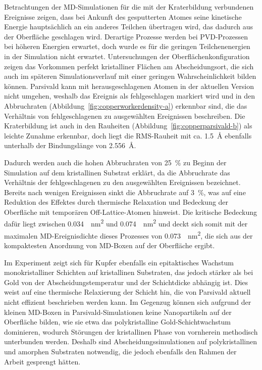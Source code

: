 Betrachtungen der MD-Simulationen für die mit der Kraterbildung verbundenen Ereignisse zeigen, dass bei Ankunft des gesputterten Atomes seine kinetische Energie hauptsächlich an ein anderes Teilchen übertragen wird, das dadurch aus der Oberfläche geschlagen wird.
Derartige Prozesse werden bei PVD-Prozessen bei höheren Energien erwartet\cite{mattox_handbook_2010}, doch wurde es für die geringen Teilchenenergien in der Simulation nicht erwartet.
Untersuchungen der Oberflächenkonfiguration zeigen das Vorkommen perfekt kristalliner Flächen am Abscheidungsort, die sich auch im späteren Simulationsverlauf mit einer geringen Wahrscheinlichkeit bilden können.
Parsivald kann mit herausgeschlagenen Atomen in der aktuellen Version nicht umgehen, weshalb das Ereignis als fehlgeschlagen markiert wird und in den Abbruchraten (Abbildung~\ref{fig:copperworkerdensity-a}) erkennbar sind, die das Verhältnis von fehlgeschlagenen zu ausgewählten Ereignissen beschreiben.
Die Kraterbildung ist auch in den Rauheiten (Abbildung~\ref{fig:copperparsivald-b}) als leichte Zunahme erkennbar, doch liegt die RMS-Rauheit mit ca. \SI{1.5}{\angstrom} ebenfalls unterhalb der Bindungslänge von \SI{2.556}{\angstrom}.

Dadurch werden auch die hohen Abbruchraten von \SI{25}{\percent} zu Beginn der Simulation auf dem kristallinen Substrat erklärt, da die Abbruchrate das Verhältnis der fehlgeschlagenen zu den ausgewählten Ereignissen bezeichnet.
Bereits nach wenigen Ereignissen sinkt die Abbruchrate auf \SI{3}{\percent}, was auf eine Reduktion des Effektes durch thermische Relaxation und Bedeckung der Oberfläche mit temporären Off-Lattice-Atomen hinweist.
Die kritische Bedeckung dafür liegt zwischen \SI{0.034}{\per\nano\meter\squared} und \SI{0.074}{\per\nano\meter\squared} und deckt sich somit mit der maximalen MD-Ereignisdichte dieses Prozesses von \SI{0.073}{\per\nano\meter\squared}, die sich aus der kompaktesten Anordnung von MD-Boxen auf der Oberfläche ergibt.

Im Experiment zeigt sich für Kupfer ebenfalls ein epitaktisches Wachstum monokristalliner Schichten auf kristallinen Substraten, das jedoch stärker als bei Gold von der Abscheidungstemperatur und der Schichtdicke abhängig ist\cite{gottsche_uber_1956}.
Dies weist auf eine thermische Relaxierung der Schicht hin, die von Parsivald aktuell nicht effizient beschrieben werden kann.
Im Gegenzug können sich aufgrund der kleinen MD-Boxen in Parsivald-Simulationen keine Nanopartikeln auf der Oberfläche bilden, wie sie etwa das polykristalline Gold-Schichtwachstum dominieren, wodurch Störungen der kristallinen Phase von vornherein methodisch unterbunden werden.
Deshalb sind Abscheidungssimulationen auf polykristallinen und amorphen Substraten notwendig, die jedoch ebenfalls den Rahmen der Arbeit gesprengt hätten.

